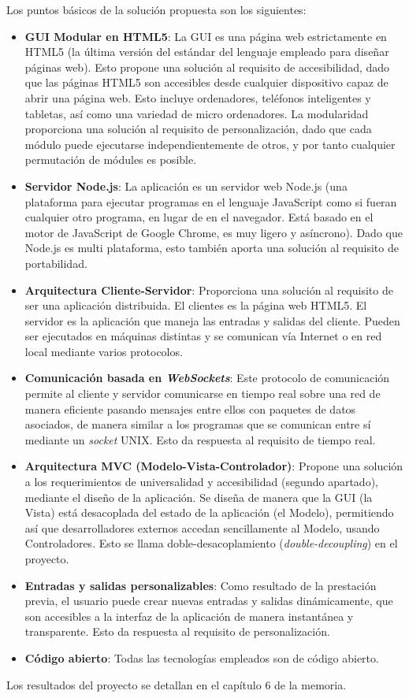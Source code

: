 Los puntos básicos de la solución propuesta son los siguientes:
\begin{itemize}
	\item \textbf{GUI Modular en HTML5}: La GUI es una página web estrictamente en HTML5 (la última versión del estándar del 
	lenguaje empleado para diseñar páginas web). Esto propone una solución al requisito de accesibilidad, dado que las páginas 
	HTML5 son accesibles desde cualquier dispositivo capaz de abrir una página web. Esto incluye ordenadores, teléfonos 
	inteligentes y tabletas, así como una variedad de micro ordenadores. La modularidad proporciona una solución al requisito de 
	personalización, dado que cada módulo puede ejecutarse independientemente de otros, y por tanto cualquier permutación de 
	módules es posible.
	\item \textbf{Servidor Node.js}: La aplicación es un servidor web Node.js (una plataforma para ejecutar programas en el 
	lenguaje JavaScript como si fueran cualquier otro programa, en lugar de en el navegador. Está basado en el motor de 
	JavaScript de Google Chrome, es muy ligero y asíncrono). Dado que Node.js es multi plataforma, esto también aporta una 
	solución al requisito de portabilidad.
	\item \textbf{Arquitectura Cliente-Servidor}: Proporciona una solución al requisito  de ser una aplicación distribuida. El 
	clientes es la página web HTML5. El servidor es la aplicación que maneja las entradas y salidas del cliente. Pueden ser 
	ejecutados en máquinas distintas y se comunican vía Internet o en red local mediante varios protocolos.
	\item \textbf{Comunicación basada en \textit{WebSockets}}: Este protocolo de comunicación permite al cliente y servidor 
	comunicarse en tiempo real sobre una red de manera eficiente pasando mensajes entre ellos con paquetes de datos asociados, de 
	manera similar a los programas que se comunican entre sí mediante un \textit{socket} UNIX. Esto da respuesta al requisito de 
	tiempo real.
	\item \textbf{Arquitectura MVC (Modelo-Vista-Controlador)}: Propone una solución a los requerimientos de universalidad y 
	accesibilidad (segundo apartado), mediante el diseño de la aplicación. Se diseña de manera que la GUI (la Vista) está 
	desacoplada del estado de la aplicación (el Modelo), permitiendo así que desarrolladores externos accedan sencillamente al 
	Modelo, usando Controladores. Esto se llama doble-desacoplamiento (\textit{double-decoupling}) en el proyecto.
	\item \textbf{Entradas y salidas personalizables}: Como resultado de la prestación previa, el usuario puede crear nuevas 
	entradas y salidas dinámicamente, que son accesibles a la interfaz de la aplicación de manera instantánea y transparente. 
	Esto da respuesta al requisito de personalización.
	\item \textbf{Código abierto}: Todas las tecnologías empleados son de código abierto.
\end{itemize}
Los resultados del proyecto se detallan en el capítulo 6 de la memoria.\\

